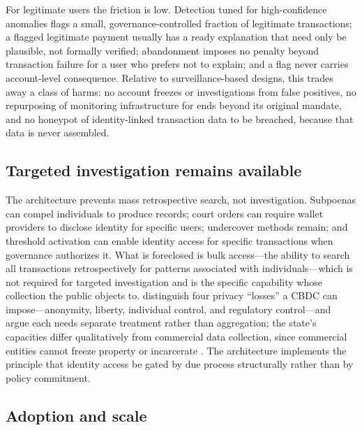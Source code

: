 \documentclass[11pt]{article}
\begin{document}
For legitimate users the friction is low. Detection tuned for high-confidence anomalies flags a small,
governance-controlled fraction of legitimate transactions; a flagged legitimate payment usually has a
ready explanation that need only be plausible, not formally verified; abandonment imposes no penalty
beyond transaction failure for a user who prefers not to explain; and a flag never carries
account-level consequence. Relative to surveillance-based designs, this trades away a class of harms:
no account freezes or investigations from false positives, no repurposing of monitoring infrastructure
for ends beyond its original mandate, and no honeypot of identity-linked transaction data to be
breached, because that data is never assembled.

\subsection{Targeted investigation remains available}

The architecture prevents mass retrospective search, not investigation. Subpoenas can compel
individuals to produce records; court orders can require wallet providers to disclose identity for
specific users; undercover methods remain; and threshold activation can enable identity access for
specific transactions when governance authorizes it. What is foreclosed is bulk access---the ability
to search all transactions retrospectively for patterns associated with individuals---which is not
required for targeted investigation and is the specific capability whose collection the public
objects to. \citet{Rennie2021} distinguish four privacy ``losses'' a CBDC can impose---anonymity,
liberty, individual control, and regulatory control---and argue each needs separate treatment rather
than aggregation; the state's capacities differ qualitatively from commercial data collection, since
commercial entities cannot freeze property or incarcerate \citep{IMF2024CBDC}. The architecture
implements the principle that identity access be gated by due process structurally rather than by
policy commitment.

\subsection{Adoption and scale}
\end{document}
